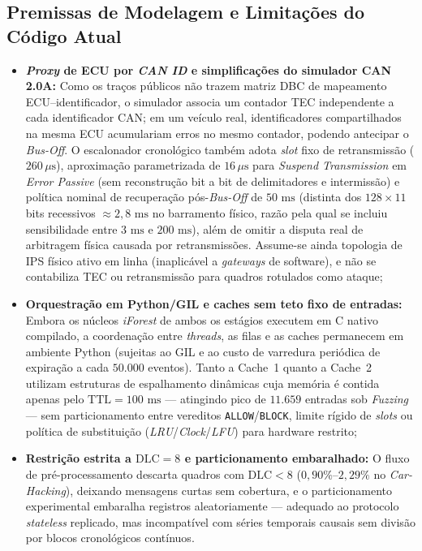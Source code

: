 \documentclass[conference]{IEEEtran}
\begin{document}
\subsection*{Premissas de Modelagem e Limitações do Código Atual}
\begin{itemize}
    \item \textbf{\textit{Proxy} de ECU por \textit{CAN ID} e simplificações do simulador CAN 2.0A:} Como os traços públicos não trazem matriz DBC de mapeamento ECU--identificador, o simulador associa um contador TEC independente a cada identificador CAN; em um veículo real, identificadores compartilhados na mesma ECU acumulariam erros no mesmo contador, podendo antecipar o \textit{Bus-Off}. O escalonador cronológico também adota \textit{slot} fixo de retransmissão ($260\,\mu\text{s}$), aproximação parametrizada de $16\,\mu\text{s}$ para \textit{Suspend Transmission} em \textit{Error Passive} (sem reconstrução bit a bit de delimitadores e intermissão) e política nominal de recuperação pós-\textit{Bus-Off} de $50\text{ ms}$ (distinta dos $128 \times 11$ bits recessivos $\approx 2{,}8\text{ ms}$ no barramento físico, razão pela qual se incluiu sensibilidade entre $3\text{ ms}$ e $200\text{ ms}$), além de omitir a disputa real de arbitragem física causada por retransmissões. Assume-se ainda topologia de IPS físico ativo em linha (inaplicável a \textit{gateways} de software), e não se contabiliza TEC ou retransmissão para quadros rotulados como ataque;
    \item \textbf{Orquestração em Python/GIL e caches sem teto fixo de entradas:} Embora os núcleos \textit{iForest} de ambos os estágios executem em C nativo compilado, a coordenação entre \textit{threads}, as filas e as caches permanecem em ambiente Python (sujeitas ao GIL e ao custo de varredura periódica de expiração a cada $50.000$ eventos). Tanto a Cache~1 quanto a Cache~2 utilizam estruturas de espalhamento dinâmicas cuja memória é contida apenas pelo $\text{TTL}=100\text{ ms}$ --- atingindo pico de $11.659$ entradas sob \textit{Fuzzing} --- sem particionamento entre vereditos \texttt{ALLOW}/\texttt{BLOCK}, limite rígido de \textit{slots} ou política de substituição (\textit{LRU}/\textit{Clock}/\textit{LFU}) para hardware restrito;
    \item \textbf{Restrição estrita a $\text{DLC}=8$ e particionamento embaralhado:} O fluxo de pré-processamento descarta quadros com $\text{DLC} < 8$ ($0{,}90\%$--$2{,}29\%$ no \textit{Car-Hacking}), deixando mensagens curtas sem cobertura, e o particionamento experimental embaralha registros aleatoriamente --- adequado ao protocolo \textit{stateless} replicado, mas incompatível com séries temporais causais sem divisão por blocos cronológicos contínuos.
\end{itemize}
\end{document}
